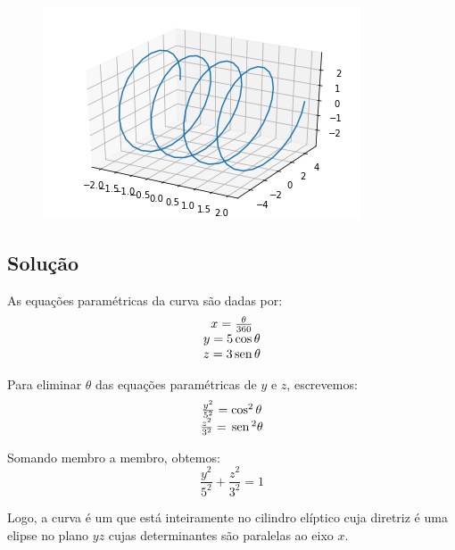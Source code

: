 \documentclass[a4paper,11pt,pagenumber=true]{article}
\newcommand{\sen}{\text{\,sen\,}}
\theoremstyle{mytheor}
\begin{document}
        \begin{figure}[h]
        \centering
            \includegraphics[width=.9\textwidth]{images/q-3.png}
            \label{fig:q3}
        \end{figure}        
        
        \subsection*{Solução}
        
            As equações paramétricas da curva são dadas por: 
            \[
                \begin{matrix}
                    x = \frac{\theta}{360}  \\
                    y = 5 \cos \theta       \\
                    z = 3 \sen \theta
                \end{matrix}
            \]
            
            Para eliminar $\theta$ das equações paramétricas de $y$ e $z$, escrevemos:
            \[
                \begin{matrix}
                    \frac{y^2}{5^2} = \cos^2 \theta \\
                    \frac{z^2}{3^2} = \sen^2 \theta
                \end{matrix}
            \]
            
            Somando membro a membro, obtemos:
            \[\frac{y^2}{5^2} + \frac{z^2}{3^2} = 1\]
            
            Logo, a curva é um  que está inteiramente no cilindro elíptico cuja diretriz é uma elipse no plano $yz$ cujas determinantes são paralelas ao eixo $x$. \cite{leitholdcalculo} \\
    
\end{document}
